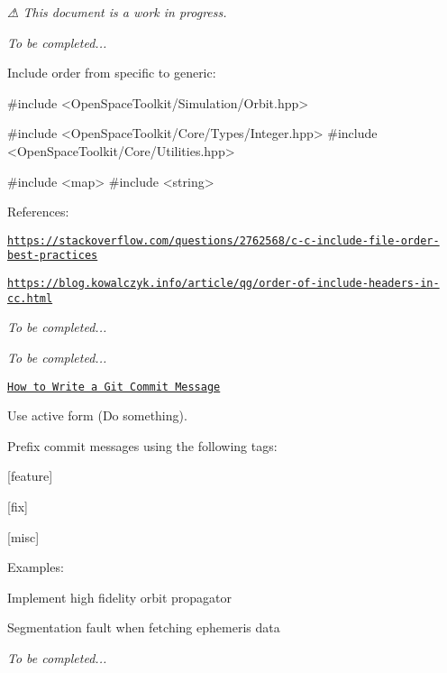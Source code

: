 {\itshape ⚠ This document is a work in progress.}

{\itshape To be completed...}

Include order from specific to generic\+:


\begin{DoxyCode}
\textcolor{preprocessor}{#include <OpenSpaceToolkit/Simulation/Orbit.hpp>}

\textcolor{preprocessor}{#include <OpenSpaceToolkit/Core/Types/Integer.hpp>}
\textcolor{preprocessor}{#include <OpenSpaceToolkit/Core/Utilities.hpp>}

\textcolor{preprocessor}{#include <map>}
\textcolor{preprocessor}{#include <string>}
\end{DoxyCode}


References\+:


\begin{DoxyItemize}
\item \href{https://stackoverflow.com/questions/2762568/c-c-include-file-order-best-practices}{\tt https\+://stackoverflow.\+com/questions/2762568/c-\/c-\/include-\/file-\/order-\/best-\/practices}
\item \href{https://blog.kowalczyk.info/article/qg/order-of-include-headers-in-cc.html}{\tt https\+://blog.\+kowalczyk.\+info/article/qg/order-\/of-\/include-\/headers-\/in-\/cc.\+html}
\end{DoxyItemize}

{\itshape To be completed...}

{\itshape To be completed...}

\href{https://chris.beams.io/posts/git-commit/}{\tt How to Write a Git Commit Message}

Use active form ({\ttfamily Do something}).

Prefix commit messages using the following tags\+:


\begin{DoxyItemize}
\item \mbox{[}feature\mbox{]}
\item \mbox{[}fix\mbox{]}
\item \mbox{[}misc\mbox{]}
\end{DoxyItemize}

Examples\+:


\begin{DoxyCode}
[feature] Implement high fidelity orbit propagator
\end{DoxyCode}



\begin{DoxyCode}
[fix] Segmentation fault when fetching ephemeris data
\end{DoxyCode}


{\itshape To be completed...} 